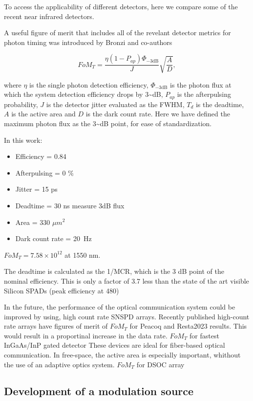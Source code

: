 \documentclass[11pt]{caltech_thesis} %
\begin{document}
To access the applicability of different detectors, here we compare some
of the recent near infrared detectors.

A useful figure of merit that includes all of the revelant detector
metrics for photon timing was introduced by Bronzi and co-authors
\autocite{Bronzi2016}

\[FoM_T = \frac{\eta  (1 - P_{ap})\Phi_{-3 \text{dB}}}{J} \sqrt{\frac{A}{D}},\]

where \(\eta\) is the single photon detection efficiency,
\(\Phi_{-3 \text{dB}}\) is the photon flux at which the system detection
efficiency drops by 3\textasciitilde dB, \(P_{ap}\) is the afterpulsing
probability, \(J\) is the detector jitter evaluated as the FWHM, \(T_d\)
is the deadtime, \(A\) is the active area and \(D\) is the dark count
rate. Here we have defined the maximum photon flux as the
3\textasciitilde dB point, for ease of standardization.

In this work:

\begin{itemize}
\tightlist
\item
  Efficiency = 0.84
\item
  Afterpulsing = 0 \%
\item
  Jitter = 15 ps
\item
  Deadtime = 30 ns {measure 3dB flux}
\item
  Area = 330 \(\mu m^2\)
\item
  Dark count rate = 20~Hz
\end{itemize}

\(FoM_T = 7.58 \times 10^{12}\) at 1550 nm.

The deadtime is calculated as the 1/MCR, which is the 3 dB point of the
nominal efficiency. This is only a factor of 3.7 less than the state of
the art visible Silicon SPADs (peak efficiency at 480\nm)
\autocite{Gramuglia2022}

In the future, the performance of the optical communication system could
be improved by using, high count rate SNSPD arrays. Recently published
high-count rate arrays have figures of merit of {\(FoM_T\) for Peacoq
and Resta2023 results}. This would result in a proportinal increase in
the data rate. {\(FoM_T\) for fastest InGaAs/InP gated detector} These
devices are ideal for fiber-based optical communication. In free-space,
the active area is especially important, whithout the use of an adaptive
optics system. {\(FoM_T\) for DSOC array}

\hypertarget{development-of-a-modulation-source-1}{%
\subsection{Development of a modulation
source}\label{development-of-a-modulation-source-1}}
\end{document}

